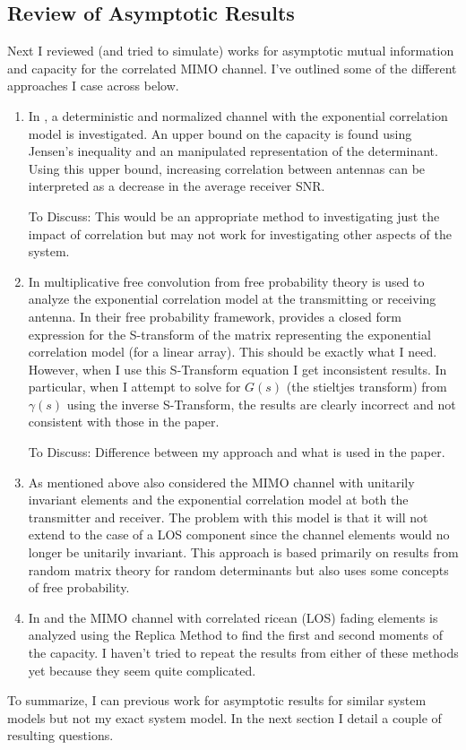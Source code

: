 \documentclass[12pt,a4paper]{report}
\begin{document}
\subsection{Review of Asymptotic Results}
Next I reviewed (and tried to simulate) works for asymptotic mutual information and capacity for the correlated MIMO channel. I've outlined some of the different approaches I case across below.
\begin{enumerate}

\item
In \cite{loyka2001channel}, a deterministic and normalized channel with the exponential correlation model is investigated. An upper bound on the capacity is found using Jensen's inequality and an manipulated representation of the determinant. Using this upper bound, increasing correlation between antennas can be interpreted as a decrease in the average receiver SNR. 
\par
To Discuss: This would be an appropriate method to investigating just the impact of correlation but may not work for investigating other aspects of the system. 

\item
In \cite{skupch2005free} multiplicative free convolution from free probability theory is used to analyze the exponential correlation model at the transmitting or receiving antenna. In their free probability framework, \cite{skupch2005free} provides a closed form expression for the S-transform of the matrix representing the exponential correlation model (for a linear array). This should be exactly what I need. However, when I use this S-Transform equation I get inconsistent results. In particular, when I attempt to solve for $G(s)$ (the stieltjes transform) from $\gamma(s)$ using the inverse S-Transform, the results are clearly incorrect and not consistent with those in the paper. 
\par
To Discuss: Difference between my approach and what is used in the paper.

\item 
As mentioned above  \cite{chuah2002capacity} also considered the MIMO channel with unitarily invariant elements and the exponential correlation model at both the transmitter
and receiver. The problem with this model is that it will not extend to the case of a LOS component since the channel elements would no longer be unitarily invariant.
This approach is based primarily on results from random matrix theory for random determinants but also uses some concepts of free probability.

\item 
In \cite{taricco2008asymptotic} and \cite{moustakas2003mimo} the MIMO channel with correlated ricean (LOS) fading elements is analyzed using the Replica Method to find the first and second moments of the capacity. I haven't tried to repeat the results from either of these methods yet because they seem quite complicated. 

\end{enumerate}
To summarize, I can previous work for asymptotic results for similar system models but not my exact system model. 
In the next section I detail a couple of resulting questions.
\end{document}
